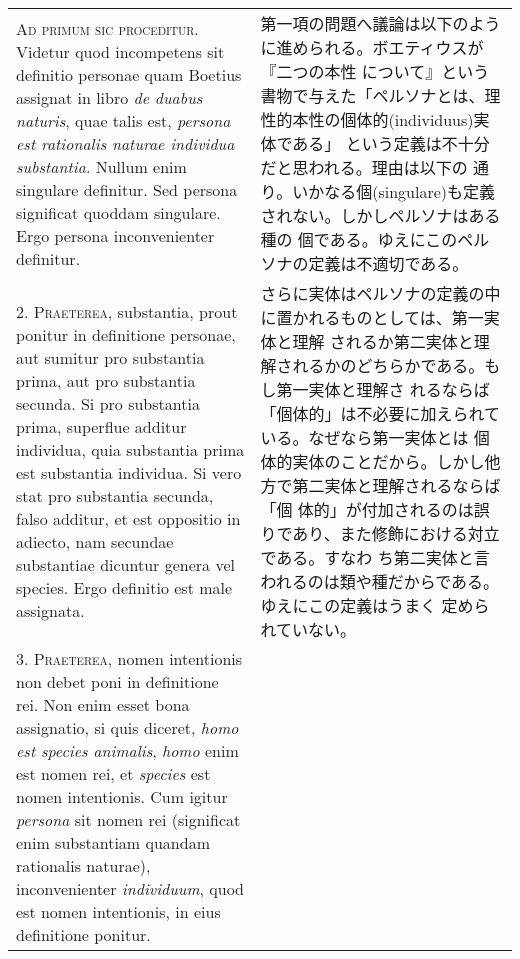 \documentclass[10pt]{jsarticle} %
\begin{document}
\begin{longtable}{p{21em}p{21em}}


{\Huge A}{\scshape d primum sic proceditur}. Videtur quod incompetens sit definitio
personae quam Boetius assignat in libro {\itshape de duabus naturis}, quae talis
est, {\itshape persona est rationalis naturae individua substantia}. Nullum enim
singulare definitur. Sed persona significat quoddam singulare. Ergo
persona inconvenienter definitur.


&

第一項の問題へ議論は以下のように進められる。ボエティウスが『二つの本性
 について』という書物で与えた「ペルソナとは、理性的本性の個体的(individuus)実体である」
 という定義は不十分だと思われる。理由は以下の
 通り。いかなる個(singulare)も定義されない。しかしペルソナはある種の
 個である。ゆえにこのペルソナの定義は不適切である。

\\



2. {\scshape Praeterea}, substantia, prout ponitur in definitione personae, aut
sumitur pro substantia prima, aut pro substantia secunda. Si pro
substantia prima, superflue additur individua, quia substantia prima est
substantia individua. Si vero stat pro substantia secunda, falso
additur, et est oppositio in adiecto, nam secundae substantiae dicuntur
genera vel species. Ergo definitio est male assignata.


&

さらに実体はペルソナの定義の中に置かれるものとしては、第一実体と理解
 されるか第二実体と理解されるかのどちらかである。もし第一実体と理解さ
 れるならば「個体的」は不必要に加えられている。なぜなら第一実体とは
 個体的実体のことだから。しかし他方で第二実体と理解されるならば「個
 体的」が付加されるのは誤りであり、また修飾における対立である。すなわ
 ち第二実体と言われるのは類や種だからである。ゆえにこの定義はうまく
 定められていない。


\\



3. {\scshape Praeterea}, nomen intentionis non debet poni in definitione rei. Non enim
esset bona assignatio, si quis diceret, {\itshape homo est species animalis}, {\itshape homo}
enim est nomen rei, et {\itshape species} est nomen intentionis. Cum igitur {\itshape persona}
sit nomen rei (significat enim substantiam quandam rationalis naturae),
inconvenienter {\itshape individuum}, quod est nomen intentionis, in eius
definitione ponitur.



\end{longtable}
\end{document}
